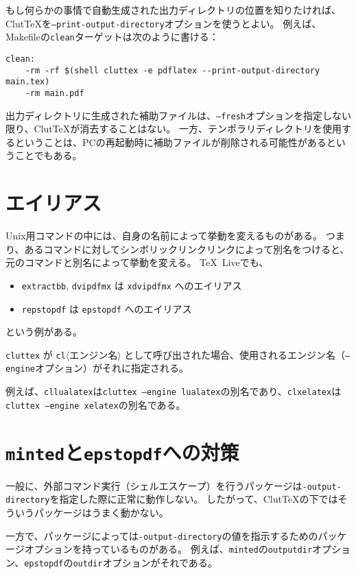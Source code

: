 \documentclass[a4paper]{ltjsreport}
\newcommand\ClutTeX{Clut\TeX}
\newcommand\texpkg[1]{\texttt{#1}}
\begin{document}
もし何らかの事情で自動生成された出力ディレクトリの位置を知りたければ、\ClutTeX{}を\texttt{--print-output-directory}オプションを使うとよい。
例えば、Makefileの\texttt{clean}ターゲットは次のように書ける：
\begin{verbatim}
clean:
    -rm -rf $(shell cluttex -e pdflatex --print-output-directory main.tex)
    -rm main.pdf
\end{verbatim}

出力ディレクトリに生成された補助ファイルは、\texttt{--fresh}オプションを指定しない限り、\ClutTeX{}が消去することはない。
一方、テンポラリディレクトリを使用するということは、PCの再起動時に補助ファイルが削除される可能性があるということでもある。

\section{エイリアス}
Unix用コマンドの中には、自身の名前によって挙動を変えるものがある。
つまり、あるコマンドに対してシンボリックリンクリンクによって別名をつけると、元のコマンドと別名によって挙動を変える。
\TeX\ Liveでも、
\begin{itemize}
\item \texttt{extractbb}, \texttt{dvipdfmx} は \texttt{xdvipdfmx} へのエイリアス
\item \texttt{repstopdf} は \texttt{epstopdf} へのエイリアス
\end{itemize}
という例がある。

\texttt{cluttex} が \texttt{cl}\(\langle\text{エンジン名}\rangle\) として呼び出された場合、使用されるエンジン名（\texttt{--engine}オプション）がそれに指定される。

例えば、\texttt{cllualatex}は\texttt{cluttex --engine lualatex}の別名であり、\texttt{clxelatex}は\texttt{cluttex --engine xelatex}の別名である。

\section{\texpkg{minted}と\texpkg{epstopdf}への対策}
一般に、外部コマンド実行（シェルエスケープ）を行うパッケージは\texttt{-output-directory}を指定した際に正常に動作しない。
したがって、\ClutTeX{}の下ではそういうパッケージはうまく動かない。

一方で、パッケージによっては\texttt{-output-directory}の値を指示するためのパッケージオプションを持っているものがある。
例えば、\texpkg{minted}の\texttt{outputdir}オプション、\texpkg{epstopdf}の\texttt{outdir}オプションがそれである。
\end{document}
